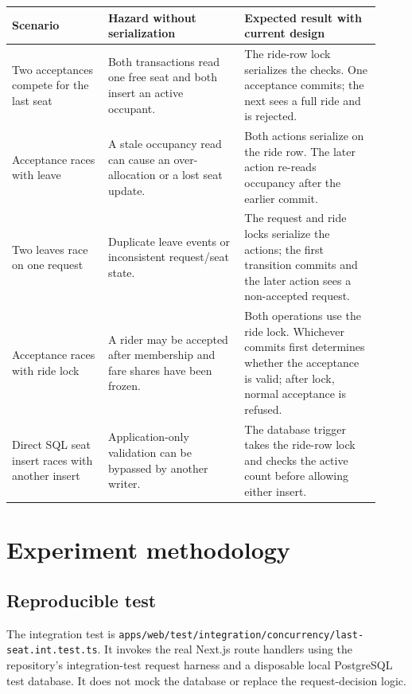 \documentclass[11pt,a4paper]{article}
\begin{document}
\begin{longtable}{p{0.24\linewidth}p{0.34\linewidth}p{0.34\linewidth}}
\toprule
\textbf{Scenario} & \textbf{Hazard without serialization} & \textbf{Expected result with current design}\\
\midrule
Two acceptances compete for the last seat &
Both transactions read one free seat and both insert an active occupant. &
The ride-row lock serializes the checks. One acceptance commits; the next sees a full ride and is rejected.\\
\addlinespace
Acceptance races with leave &
A stale occupancy read can cause an over-allocation or a lost seat update. &
Both actions serialize on the ride row. The later action re-reads occupancy after the earlier commit.\\
\addlinespace
Two leaves race on one request &
Duplicate leave events or inconsistent request/seat state. &
The request and ride locks serialize the actions; the first transition commits and the later action sees a non-accepted request.\\
\addlinespace
Acceptance races with ride lock &
A rider may be accepted after membership and fare shares have been frozen. &
Both operations use the ride lock. Whichever commits first determines whether the acceptance is valid; after lock, normal acceptance is refused.\\
\addlinespace
Direct SQL seat insert races with another insert &
Application-only validation can be bypassed by another writer. &
The database trigger takes the ride-row lock and checks the active count before allowing either insert.\\
\bottomrule
\end{longtable}

\section{Experiment methodology}

\subsection{Reproducible test}

The integration test is
\texttt{apps/web/test/integration/concurrency/last-seat.int.test.ts}. It invokes the real Next.js
route handlers using the repository's integration-test request harness and a disposable local
PostgreSQL test database. It does not mock the database or replace the request-decision logic.
\end{document}
